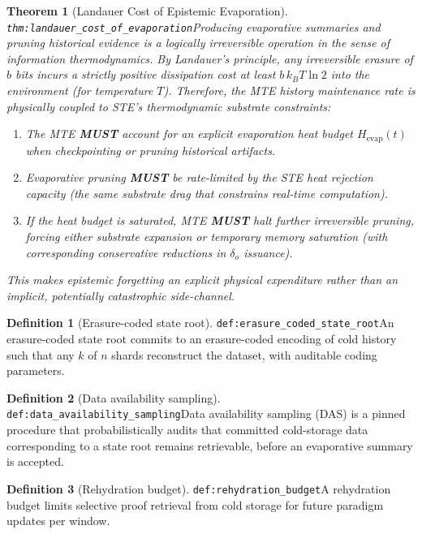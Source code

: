 \documentclass[11pt]{article}
\theoremstyle{definition}
\newtheorem{definition}{Definition}
\theoremstyle{plain}
\newtheorem{theorem}{Theorem}
\newcommand{\MUST}{\textbf{MUST}}
\newcommand{\STE}{\textsf{STE}}
\newcommand{\lbl}[1]{\texttt{\footnotesize\nolinkurl{#1}}}
\newcommand{\DefLabel}[1]{\hfill{\small\lbl{#1}}}
\begin{document}
\begin{theorem}[Landauer Cost of Epistemic Evaporation]\DefLabel{thm:landauer_cost_of_evaporation}\label{thm:landauer_cost_of_evaporation}
Producing evaporative summaries and pruning historical evidence is a logically irreversible operation in the sense of information thermodynamics.
By Landauer's principle, any irreversible erasure of $b$ bits incurs a strictly positive dissipation cost at least $b\,k_B T\ln 2$ into the environment (for temperature $T$).
Therefore, the MTE \emph{history maintenance rate} is physically coupled to \STE{}'s thermodynamic substrate constraints:
\begin{enumerate}
\item The MTE \MUST{} account for an explicit evaporation heat budget $H_{\mathrm{evap}}(t)$ when checkpointing or pruning historical artifacts.
\item Evaporative pruning \MUST{} be rate-limited by the \STE{} heat rejection capacity (the same substrate drag that constrains real-time computation).
\item If the heat budget is saturated, MTE \MUST{} halt further irreversible pruning, forcing either substrate expansion or temporary memory saturation (with corresponding conservative reductions in $\delta_o$ issuance).
\end{enumerate}
This makes epistemic forgetting an explicit physical expenditure rather than an implicit, potentially catastrophic side-channel.
\end{theorem}

\begin{definition}[Erasure-coded state root]\DefLabel{def:erasure_coded_state_root}\label{def:erasure_coded_state_root}
An erasure-coded state root commits to an erasure-coded encoding of cold history such that any $k$ of $n$ shards reconstruct the dataset, with auditable coding parameters.
\end{definition}

\begin{definition}[Data availability sampling]\DefLabel{def:data_availability_sampling}\label{def:data_availability_sampling}
Data availability sampling (DAS) is a pinned procedure that probabilistically audits that committed cold-storage data corresponding to a state root remains retrievable, before an evaporative summary is accepted.
\end{definition}

\begin{definition}[Rehydration budget]\DefLabel{def:rehydration_budget}\label{def:rehydration_budget}
A rehydration budget limits selective proof retrieval from cold storage for future paradigm updates per window.
\end{definition}
\end{document}
